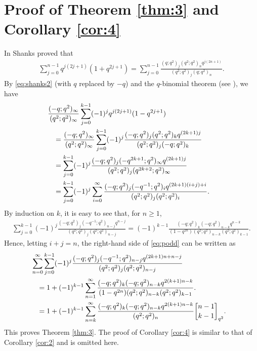 \documentclass[12pt]{article}
\theoremstyle{remark}
\numberwithin{equation}{section}
\begin{document}
\section{Proof of Theorem \ref{thm:3} and Corollary \ref{cor:4}}
In \cite{Shanks,Shanks2} Shanks proved that
\begin{align}
\sum_{j=0}^{n-1}q^{j(2j+1)}(1+q^{2j+1}) =\sum_{j=0}^{n-1}
\frac{(q;q^2)_j (q^2;q^2)_n q^{j(2n+1) }}{(q^2;q^2)_j (q;q^2)_n}.
\label{eq:shanks2}
\end{align}
By \eqref{eq:shanks2} (with $q$ replaced by $-q$) and
the $q$-binomial theorem (see \cite[Theorem 2.1]{Andrews98}), we have
\begin{align}
&\hskip -3mm \frac{(-q;q^2)_\infty}{(q^2;q^2)_\infty}
\sum_{j=0}^{k-1}(-1)^jq^{j(2j+1)}(1-q^{2j+1})\nonumber \\
&=\frac{(-q;q^2)_\infty}{(q^2;q^2)_\infty}
\sum_{j=0}^{k-1} (-1)^j \frac{(-q;q^2)_{j} (q^2;q^2)_k q^{(2k+1)j}}{(q^2;q^2)_j (-q;q^2)_{k}} \nonumber\\
&=\sum_{j=0}^{k-1} (-1)^j \frac{(-q;q^2)_{j} (-q^{2k+1};q^2)_\infty
q^{(2k+1)j}}{(q^2;q^2)_j (q^{2k+2};q^2)_{\infty}} \nonumber\\
&=\sum_{j=0}^{k-1} (-1)^j \sum_{i=0}^{\infty}\frac{(-q;q^2)_{j}
(-q^{-1};q^2)_i q^{(2k+1)(i+j)+i}}{(q^2;q^2)_j (q^2;q^2)_i}.
\label{eq:podd}
\end{align}
By induction on $k$, it is easy to see that, for $n\geqslant 1$,
\begin{align*}
\sum_{j=0}^{k-1}(-1)^j \frac{(-q;q^2)_{j}
(-q^{-1};q^2)_{n-j}q^{n-j}}{(q^2;q^2)_j (q^2;q^2)_{n-j}}
=(-1)^{k-1}\frac{(-q;q^2)_{k} (-q;q^2)_{n-k}
q^{n-k}}{(1-q^{2n})(q^2;q^2)_{n-k} (q^2;q^2)_{k-1}}.
\end{align*}
Hence, letting $i+j=n$, the right-hand side of \eqref{eq:podd} can be written as
\begin{align*}
&\hskip -3mm \sum_{n=0}^\infty
\sum_{j=0}^{k-1} (-1)^j \frac{(-q;q^2)_{j} (-q^{-1};q^2)_{n-j}q^{(2k+1)n+n-j}}{(q^2;q^2)_j (q^2;q^2)_{n-j}}\\
&=1+(-1)^{k-1} \sum_{n=1}^\infty \frac{(-q;q^2)_{k} (-q;q^2)_{n-k} q^{2(k+1)n-k}}
{(1-q^{2n})(q^2;q^2)_{n-k} (q^2;q^2)_{k-1}}.\\
&=1+(-1)^{k-1} \sum_{n=k}^\infty \frac{(-q;q^2)_{k} (-q;q^2)_{n-k}q^{2(k+1)n-k}}
{(q^2;q^2)_n}{n-1\brack k-1}_{q^2}.
\end{align*}
This proves Theorem \ref{thm:3}. The proof of Corollary \ref{cor:4} is similar to that of Corollary \ref{cor:2} and is
omitted here.
\end{document}
